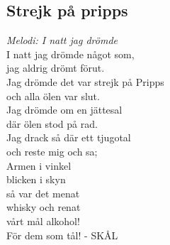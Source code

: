 \documentclass[a5paper]{article}
\begin{document}
\subsection{Strejk på pripps}
\textit{Melodi: I natt jag drömde}\\

\noindent
I natt jag drömde något som,\\
jag aldrig drömt förut.\\ 
Jag drömde det var strejk på Pripps\\
och alla ölen var slut.\\
Jag drömde om en jättesal\\
där ölen stod på rad.\\
Jag drack så där ett tjugotal\\
och reste mig och sa;\\

\noindent
Armen i vinkel\\
blicken i skyn\\
så var det menat\\
whisky och renat\\
vårt mål alkohol!\\
För dem som tål! - SKÅL\\
\newpage	
\end{document}
